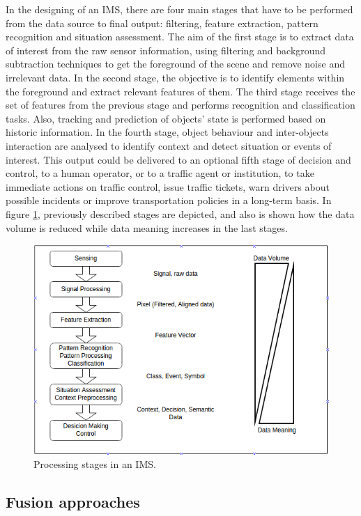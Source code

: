 In the designing of an IMS, there are four main stages that have to be performed from the data source to final output: filtering, feature extraction, pattern recognition and situation assessment. The aim of the first stage is to extract data of interest from the raw sensor information, using filtering and background subtraction techniques to get the foreground of the scene and remove noise and irrelevant data. In the second stage, the objective is to identify elements within the foreground and extract relevant features of them. The third stage receives the set of features from the previous stage and performs recognition and classification tasks. Also, tracking and prediction of objects' state is performed based on historic information. In the fourth stage, object behaviour and inter-objects interaction are analysed to identify context and detect situation or events of interest. This output could be delivered to an optional fifth stage of decision and control, to a human operator, or to a traffic agent or institution, to take immediate actions on traffic control, issue traffic tickets, warn drivers about possible incidents or improve transportation policies in a long-term basis. In figure \ref{proc_stages}, previously described stages are depicted, and also is shown how the data volume is reduced while data meaning increases in the last stages.

\begin{figure}[ht!]
\centering
\includegraphics[scale=0.55]{fig/3/proc_stages.png}
\caption{Processing stages in an IMS.}
\label{proc_stages}
\end{figure}

\subsection{Fusion approaches}

